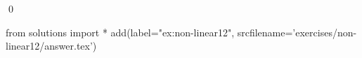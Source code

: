
\begin{ex} 
  \label{ex:non-linear12}
  
  \qed
\end{ex} 
\begin{python0}
from solutions import *
add(label="ex:non-linear12",
    srcfilename='exercises/non-linear12/answer.tex') 
\end{python0}
